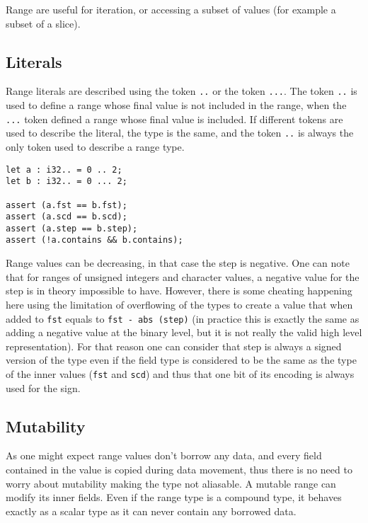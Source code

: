 Range are useful for iteration, or accessing a subset of values (for example a
subset of a slice).

\subsection {Literals}

Range literals are described using the token \texttt{..} or the token
\texttt{...}. The token \texttt{..} is used to define a range whose final value
is not included in the range, when the \texttt{...} token defined a range whose
final value is included. If different tokens are used to describe the literal,
the type is the same, and the token \texttt{..} is always the only token used to
describe a range type.

\begin{lstlisting}[style=coloredverbatim]
let a : i32.. = 0 .. 2;
let b : i32.. = 0 ... 2;

assert (a.fst == b.fst);
assert (a.scd == b.scd);
assert (a.step == b.step);
assert (!a.contains && b.contains);
\end{lstlisting}

Range values can be decreasing, in that case the step is negative. One can note
that for ranges of unsigned integers and character values, a negative value for
the step is in theory impossible to have. However, there is some cheating
happening here using the limitation of overflowing of the types to create a
value that when added to \texttt{fst} equals to \texttt{fst - abs (step)} (in
practice this is exactly the same as adding a negative value at the binary
level, but it is not really the valid high level representation). For that
reason one can consider that step is always a signed version of the type even if
the field type is considered to be the same as the type of the inner values
(\texttt{fst} and \texttt{scd}) and thus that one bit of its encoding is always
used for the sign.

\subsection {Mutability}

As one might expect range values don't borrow any data, and every field
contained in the value is copied during data movement, thus there is no need to
worry about mutability making the type not aliasable. A mutable range can modify
its inner fields. Even if the range type is a compound type, it behaves exactly
as a scalar type as it can never contain any borrowed data.

